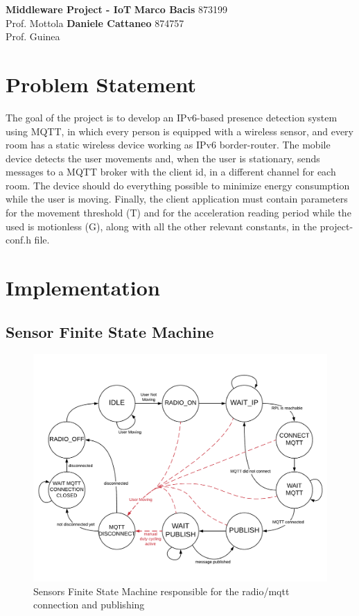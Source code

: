 \documentclass[a4paper, 11pt]{article}
\begin{document}
\noindent
\large\textbf{Middleware Project - IoT} \hfill \textbf{Marco Bacis} 873199 \\
Prof. Mottola \hfill \textbf{Daniele Cattaneo} 874757 \\
Prof. Guinea

\section*{Problem Statement}

The goal of the project is to develop an IPv6-based presence detection system using MQTT, in which every person is equipped with a wireless sensor, and every room has a static wireless device working as IPv6 border-router.
The mobile device detects the user movements and, when the user is stationary, sends messages to a MQTT broker with the client id, in a different channel for each room.
The device should do everything possible to minimize energy consumption while the user is moving.
Finally, the client application must contain parameters for the movement threshold (T) and for the acceleration reading period while the used is motionless (G), along with all the other relevant constants, in the project-conf.h file.

\section*{Implementation}

\subsection*{Sensor Finite State Machine}

\begin{figure}[h]
\centering
    \includegraphics[width=\linewidth]{images/fsm.pdf}
    \caption{Sensors Finite State Machine responsible for the radio/mqtt connection and publishing}
    \label{fig:sensor_fsm}
\end{figure}
\end{document}
